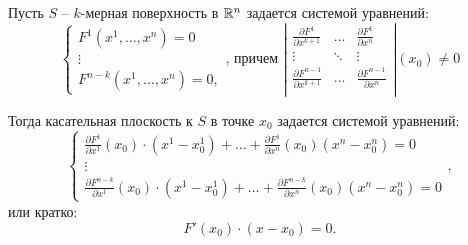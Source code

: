\newpage

\begin{statement}
    Пусть $S$ -- $k$-мерная поверхность в $\mathbb{R}^n$ задается системой уравнений:
    \begin{equation}\label{eq:9}
        \left\{\begin{array}{l}
            F^1(x^1,\ldots,x^n) = 0 \\
            \vdots                  \\
            F^{n-k}(x^1,\ldots,x^n) = 0,
        \end{array}\right.\text{, причем }\left|\begin{array}{ccc}
            \frac{\partial F^1}{\partial x^{k+1}}     & \ldots & \frac{\partial F^1}{\partial x^n}     \\
            \vdots                                & \ddots & \vdots                            \\
            \frac{\partial F^{n-1}}{\partial x^{k+1}} & \ldots & \frac{\partial F^{n-1}}{\partial x^n} \\
        \end{array}\right|(x_0) \ne 0
    \end{equation}

    Тогда касательная плоскость к $S$ в точке $x_0$ задается системой уравнений:
    \[
        \left\{\begin{array}{l}
            \frac{\partial F^1}{\partial x^1}(x_0)\cdot (x^1-x^1_0) + \ldots + \frac{\partial F^1}{\partial x^n}(x_0)(x^n - x_0^n) = 0 \\
            \vdots                                                                                                             \\
            \frac{\partial F^{n-k}}{\partial x^1}(x_0)\cdot (x^1-x^1_0) + \ldots + \frac{\partial F^{n-k}}{\partial x^n}(x_0)(x^n - x_0^n) = 0
        \end{array}\right.,
    \]
    или кратко:
    \[
        F'(x_0)\cdot(x-x_0) = 0.
    \]
\end{statement}

